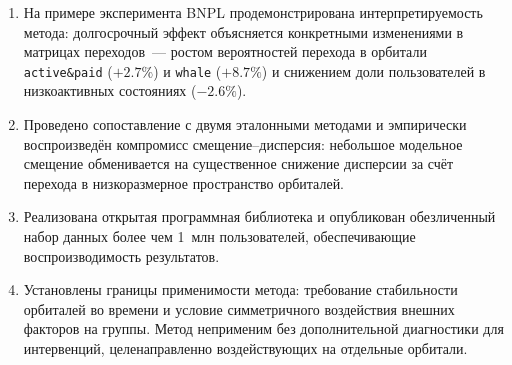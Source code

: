 \begin{enumerate}
    \item На примере эксперимента BNPL продемонстрирована
          интерпретируемость метода: долгосрочный эффект объясняется
          конкретными изменениями в матрицах переходов~--- ростом
          вероятностей перехода в орбитали \texttt{active\&paid}
          ($+2.7\%$) и \texttt{whale} ($+8.7\%$) и снижением доли
          пользователей в низкоактивных состояниях ($-2.6\%$).

    \item Проведено сопоставление с двумя эталонными методами и
          эмпирически воспроизведён компромисс смещение--дисперсия:
          небольшое модельное смещение обменивается на существенное
          снижение дисперсии за счёт перехода в низкоразмерное
          пространство орбиталей.

    \item Реализована открытая программная библиотека и опубликован
          обезличенный набор данных более чем 1~млн пользователей,
          обеспечивающие воспроизводимость результатов.

    \item Установлены границы применимости метода: требование
          стабильности орбиталей во времени и условие симметричного
          воздействия внешних факторов на группы. Метод неприменим
          без дополнительной диагностики для интервенций, целенаправленно
          воздействующих на отдельные орбитали.
\end{enumerate}
